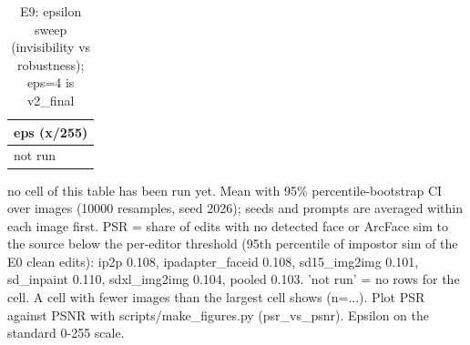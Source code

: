 \begin{table}[t]
\centering
\small
\begin{tabular}{l}
\toprule
eps (x/255) \\
\midrule
not run \\
\bottomrule
\end{tabular}
\caption{E9: epsilon sweep (invisibility vs robustness); eps=4 is v2\_final}
\label{tab:e9}
\par\footnotesize no cell of this table has been run yet. Mean with 95\% percentile-bootstrap CI over images (10000 resamples, seed 2026); seeds and prompts are averaged within each image first. PSR = share of edits with no detected face or ArcFace sim to the source below the per-editor threshold (95th percentile of impostor sim of the E0 clean edits): ip2p 0.108, ipadapter\_faceid 0.108, sd15\_img2img 0.101, sd\_inpaint 0.110, sdxl\_img2img 0.104, pooled 0.103. 'not run' = no rows for the cell. A cell with fewer images than the largest cell shows (n=...). Plot PSR against PSNR with scripts/make\_figures.py (psr\_vs\_psnr). Epsilon on the standard 0-255 scale.
\end{table}
